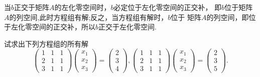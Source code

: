 ﻿\documentclass{book} \usepackage{exsheets} \usepackage{xeCJK}
\begin{document}
\begin{solution}
  当$b$正交于矩阵$A$的左化零空间时，$b$必定位于左化零空间的正交补，
  即$b$位于矩阵$A$的列空间,此时方程组有解;反之，当方程组有解时，$b$位于
  矩阵$A$的列空间，即位于左化零空间的正交补，所以$b$正交于左化零空间.
\end{solution}
\begin{question}
  试求出下列方程组的所有解
$$
\begin{pmatrix}
  1&1&1\\
  2&1&1\\
  3&1&1
\end{pmatrix}
\begin{pmatrix}
  x_1\\
  x_2\\
  x_3
\end{pmatrix}=
\begin{pmatrix}
  2\\
  3\\
  4
\end{pmatrix},
\begin{pmatrix}
  1&1&1\\
  2&1&1\\
  3&1&1
\end{pmatrix}
\begin{pmatrix}
  x_1\\
  x_2\\
  x_3
\end{pmatrix}=
\begin{pmatrix}
  2\\
  3\\
  5
\end{pmatrix}.
$$
\end{question}
\end{document}
